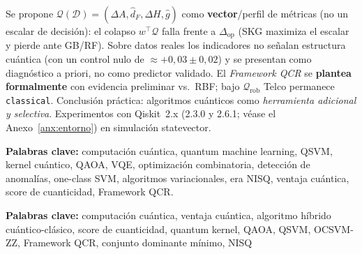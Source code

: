 Se propone $\mathcal{Q}(\mathcal{D})=(\Delta A,\hat{d}_F,\Delta H,\hat{g})$ como \textbf{vector}/perfil de métricas (no un escalar de decisión): el colapso $w^\top\mathcal{Q}$ falla frente a $\Delta_{\mathrm{op}}$ (SKG maximiza el escalar y pierde ante GB/RF). Sobre datos reales los indicadores no señalan estructura cuántica (con un control nulo de $\approx+0{,}03\pm0{,}02$) y se presentan como diagnóstico a priori, no como predictor validado. El \emph{Framework QCR} se \textbf{plantea formalmente} con evidencia preliminar vs.\ RBF; bajo $\mathcal{Q}_{\mathrm{rob}}$ Telco permanece \texttt{classical}. Conclusión práctica: algoritmos cuánticos como \emph{herramienta adicional y selectiva}. Experimentos con Qiskit~2.x (2.3.0 y 2.6.1; véase el Anexo~\ref{anx:entorno}) en simulación statevector.

\vspace{0.5em}
\noindent\textbf{Palabras clave:} computación cuántica, quantum machine learning, QSVM, kernel cuántico, QAOA, VQE, optimización combinatoria, detección de anomalías, one-class SVM, algoritmos variacionales, era NISQ, ventaja cuántica, score de cuanticidad, Framework QCR.

{\bf Palabras clave:} computación cuántica, ventaja cuántica, algoritmo híbrido cuántico-clásico, score de cuanticidad, quantum kernel, QAOA, QSVM, OCSVM-ZZ, Framework QCR, conjunto dominante mínimo, NISQ
